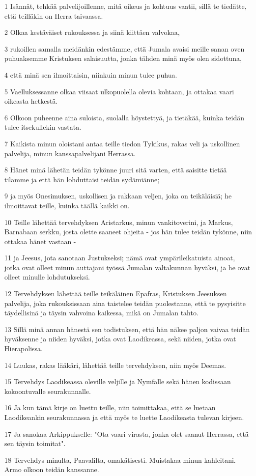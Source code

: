 \par 1 Isännät, tehkää palvelijoillenne, mitä oikeus ja kohtuus vaatii, sillä te tiedätte, että teilläkin on Herra taivaassa.
\par 2 Olkaa kestäväiset rukouksessa ja siinä kiittäen valvokaa,
\par 3 rukoillen samalla meidänkin edestämme, että Jumala avaisi meille sanan oven puhuaksemme Kristuksen salaisuutta, jonka tähden minä myös olen sidottuna,
\par 4 että minä sen ilmoittaisin, niinkuin minun tulee puhua.
\par 5 Vaelluksessanne olkaa viisaat ulkopuolella olevia kohtaan, ja ottakaa vaari oikeasta hetkestä.
\par 6 Olkoon puheenne aina suloista, suolalla höystettyä, ja tietäkää, kuinka teidän tulee itsekullekin vastata.
\par 7 Kaikista minun oloistani antaa teille tiedon Tykikus, rakas veli ja uskollinen palvelija, minun kanssapalvelijani Herrassa.
\par 8 Hänet minä lähetän teidän tykönne juuri sitä varten, että saisitte tietää tilamme ja että hän lohduttaisi teidän sydämiänne;
\par 9 ja myös Onesimuksen, uskollisen ja rakkaan veljen, joka on teikäläisiä; he ilmoittavat teille, kuinka täällä kaikki on.
\par 10 Teille lähettää tervehdyksen Aristarkus, minun vankitoverini, ja Markus, Barnabaan serkku, josta olette saaneet ohjeita - jos hän tulee teidän tykönne, niin ottakaa hänet vastaan -
\par 11 ja Jeesus, jota sanotaan Justukseksi; nämä ovat ympärileikatuista ainoat, jotka ovat olleet minun auttajani työssä Jumalan valtakunnan hyväksi, ja he ovat olleet minulle lohdutukseksi.
\par 12 Tervehdyksen lähettää teille teikäläinen Epafras, Kristuksen Jeesuksen palvelija, joka rukouksissaan aina taistelee teidän puolestanne, että te pysyisitte täydellisinä ja täysin vahvoina kaikessa, mikä on Jumalan tahto.
\par 13 Sillä minä annan hänestä sen todistuksen, että hän näkee paljon vaivaa teidän hyväksenne ja niiden hyväksi, jotka ovat Laodikeassa, sekä niiden, jotka ovat Hierapolissa.
\par 14 Luukas, rakas lääkäri, lähettää teille tervehdyksen, niin myös Deemas.
\par 15 Tervehdys Laodikeassa oleville veljille ja Nymfalle sekä hänen kodissaan kokoontuvalle seurakunnalle.
\par 16 Ja kun tämä kirje on luettu teille, niin toimittakaa, että se luetaan Laodikeankin seurakunnassa ja että myös te luette Laodikeasta tulevan kirjeen.
\par 17 Ja sanokaa Arkippukselle: "Ota vaari virasta, jonka olet saanut Herrassa, että sen täysin toimitat".
\par 18 Tervehdys minulta, Paavalilta, omakätisesti. Muistakaa minun kahleitani. Armo olkoon teidän kanssanne.


